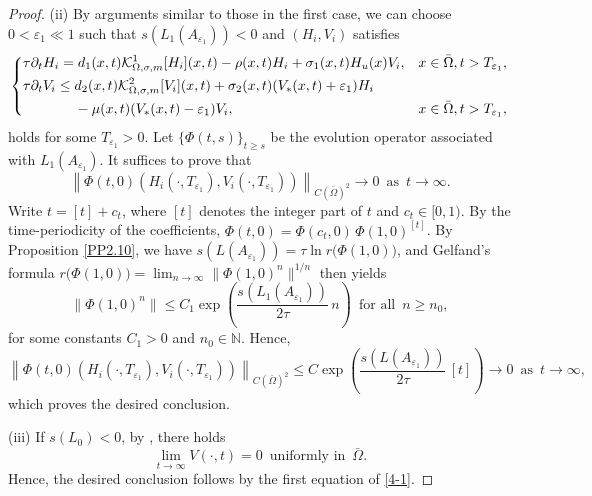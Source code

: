 \documentclass[11pt,reqno]{amsart}
\numberwithin{equation}{section}
\begin{document}
\begin{proof}
(ii)
By arguments similar to those in the first case, we can choose
$0<\varepsilon_{1}\ll1$ such that $s(L_{1}(A_{\varepsilon_{1}}))<0$ and $(H_{i},V_{i})$ satisfies \begin{equation*}
\left\{
\begin{aligned}
& \tau \partial_{t} H_{i}
= d_{1}(x,t)\mathcal{K}^{1}_{\Omega,\sigma,m}[H_{i}](x,t)
  -\rho(x,t)H_{i}+\sigma_{1}(x,t)H_{u}(x)V_{i},
&& x\in\bar\Omega, t>T_{\varepsilon_{1}},\\
& \tau \partial_{t} V_{i}
\le d_{2}(x,t)\mathcal{K}^{2}_{\Omega,\sigma,m}[V_{i}](x,t)
   +\sigma_{2}(x,t)(V_{*}(x,t)+\varepsilon_{1})H_{i}\\
   &\hspace{1.3cm}-\mu(x,t)(V_{*}(x,t)-\varepsilon_{1})V_{i},
&& x\in\bar\Omega, t>T_{\varepsilon_{1}},
\end{aligned}
\right.
\end{equation*}
holds for some $T_{\varepsilon_{1}}>0$.
Let $\{\Phi(t,s)\}_{t\geq s}$ be the evolution operator associated with
$L_{1}(A_{\varepsilon_{1}})$.
It suffices to prove that
\begin{equation*}
\left\|\Phi(t,0)\left(H_{i}(\cdot,T_{\varepsilon_{1}}),
V_{i}(\cdot,T_{\varepsilon_{1}})\right)
\right\|_{{C(\bar{\Omega})}^{2}} \to 0
\enspace\text{as}\enspace t\to\infty.
\end{equation*}
Write $t=[t]+c_{t}$, where $[t]$ denotes the integer part of $t$ and
$c_{t}\in[0,1)$. By the time-periodicity of the coefficients,  $\Phi(t,0)
= \Phi(c_{t},0)\,\Phi(1,0)^{[t]}$.
By Proposition \ref{PP2.10}, we have
$s\left(L(A_{\varepsilon_{1}})\right)
= \tau \ln r\bigl(\Phi(1,0)\bigr)$,
and Gelfand's formula
$r\bigl(\Phi(1,0)\bigr)
 = \lim_{n\to\infty}\|\Phi(1,0)^{n}\|^{1/n}$
then yields
\begin{equation*}
\|\Phi(1,0)^{n}\|
\le C_{1}\exp\!\left(\frac{s(L_{1}(A_{\varepsilon_{1}}))}{2\tau}\,n\right)
\enspace\text{for all}\enspace n\geq n_{0},
\end{equation*}
for some constants $C_{1}>0$ and $n_{0}\in\mathbb{N}$.
Hence,
\begin{equation*}
\left\|\Phi(t,0)\left(H_{i}(\cdot,T_{\varepsilon_{1}}),
V_{i}(\cdot,T_{\varepsilon_{1}})\right)
\right\|_{{C(\bar{\Omega})}^{2}}
\le C\exp\!\left(\frac{s(L(A_{\varepsilon_{1}}))}{2\tau}\,[t]\right)
\to 0 \enspace\text{as}\enspace t\to\infty,
\end{equation*}
which proves the desired conclusion.

(iii) If $s(L_{0})<0$, by \cite[Theorem B]{ShenVo}, there holds
\begin{equation*}
\lim_{ t \to\infty} V( \cdot,t) = 0
\enspace \text{uniformly in} \enspace \bar{\Omega}.
\end{equation*}
Hence, the desired conclusion follows by the first equation of \eqref{4-1}.
\end{proof}
\end{document}
